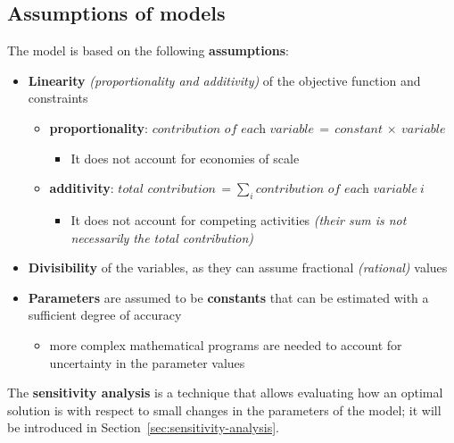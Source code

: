 \documentclass[english]{article}
\begin{document}
\subsection{Assumptions of \LP models}

The \LP model is based on the following \textbf{assumptions}:

\begin{itemize}
  \item \textbf{Linearity} \textit{(proportionality and additivity)} of the objective function and constraints
        \begin{itemize}[label=\(\rightarrow\)]
          \item \textbf{proportionality}: \( \textit{contribution of each variable} \, = \, \textit{constant} \, \times \ \textit{variable} \)
                \begin{itemize}[label=\xmarkthin]
                  \item It does not account for economies of scale
                \end{itemize}
          \item \textbf{additivity}: \(\textit{total contribution} \, =\sum_i \textit{contribution of each variable} \ i\)
                \begin{itemize}[label=\xmarkthin]
                  \item It does not account for competing activities \textit{(their sum is not necessarily the total contribution)}
                \end{itemize}
        \end{itemize}
  \item \textbf{Divisibility} of the variables, as they can assume fractional \textit{(rational)} values
  \item \textbf{Parameters} are assumed to be \textbf{constants} that can be estimated with a sufficient degree of accuracy
        \begin{itemize}[label=\xmarkthin]
          \item more complex mathematical programs are needed to account for uncertainty in the parameter values
        \end{itemize}
\end{itemize}

The \textbf{sensitivity analysis} is a technique that allows evaluating how  an optimal solution is with respect to small changes in the parameters of the model;
it will be introduced in Section~\ref{sec:sensitivity-analysis}.
\end{document}
